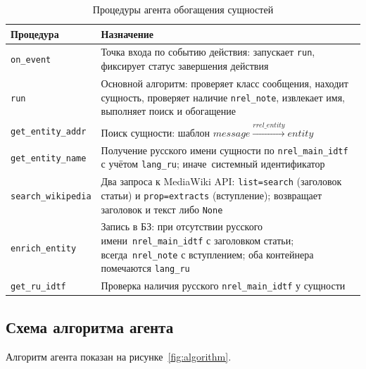 \begin{table}[H]
	\centering
	\small
	\begin{tabular}{|p{4.0cm}|p{10.4cm}|}
		\hline
		Процедура & Назначение \\
		\hline
		\texttt{on\_event} & Точка входа по событию действия: запускает \texttt{run}, фиксирует статус завершения действия \\
		\hline
		\texttt{run} & Основной алгоритм: проверяет класс сообщения, находит сущность, проверяет наличие \texttt{nrel\_note}, извлекает имя, выполняет поиск и обогащение \\
		\hline
		\texttt{get\_entity\_addr} & Поиск сущности: шаблон $message \xrightarrow{rrel\_entity} entity$ \\
		\hline
		\texttt{get\_entity\_name} & Получение русского имени сущности по \texttt{nrel\_main\_idtf} с учётом \texttt{lang\_ru}; иначе~\mdash  системный идентификатор \\
		\hline
		\texttt{search\_wikipedia} & Два запроса к MediaWiki API: \texttt{list=search} (заголовок статьи) и \texttt{prop=extracts} (вступление); возвращает заголовок и текст либо \texttt{None} \\
		\hline
		\texttt{enrich\_entity} & Запись в БЗ: при отсутствии русского имени~\mdash  \texttt{nrel\_main\_idtf} с заголовком статьи; всегда~\mdash  \texttt{nrel\_note} с вступлением; оба контейнера помечаются \texttt{lang\_ru} \\
		\hline
		\texttt{get\_ru\_idtf} & Проверка наличия русского \texttt{nrel\_main\_idtf} у сущности \\
		\hline
	\end{tabular}
	\caption{Процедуры агента обогащения сущностей}
	\label{tab:procedures}
\end{table}

\subsection{Схема алгоритма агента}

Алгоритм агента показан на рисунке~\ref{fig:algorithm}.

